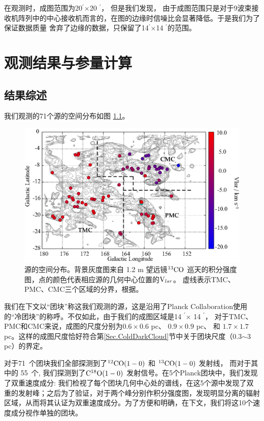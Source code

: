 \documentclass[UTF8, nocolorlinks]{pkuthss}
\newcommand{\cob}{$\rm ^{13}CO$ }
\newcommand{\coaa}{$\rm^{12}CO(1-0)$ }
\newcommand{\cobb}{$\rm^{13}CO(1-0)$ }
\newcommand{\cocc}{$\rm C^{18}O(1-0)$ }
\newcommand{\multi}{$\times$}
\newcommand{\vlsr}{${\rm V } _{lsr}$}
\newcommand{\arcmin}{$^{\prime}$}
\newcommand{\numsou}{71\ }
\newcommand{\numcocc}{55\ }
\begin{document}
        在观测时，成图范围为20\arcmin \multi 20 \arcmin ， 但是我们发现， 由于成图范围只是对于9波束接收机阵列中的中心接收机而言的，在图的边缘时信噪比会显著降低。于是我们为了保证数据质量 舍弃了边缘的数据，只保留了14\arcmin \multi 14 \arcmin 的范围。

\chapter{观测结果与参量计算}

	\section{结果综述}

		我们观测的71个源的空间分布如图 \ref{Fig.SpatialDistribution}。

		\begin{figure}[H]
			\centering
			\includegraphics[totalheight=82mm]{img_plot/SpatiaDist_Velocity_Overlay.eps}
			\caption{\small 源的空间分布。背景灰度图来自 1.2 m 望远镜\cob 巡天的积分强度图\supercite{2001ApJ...547..792D}，点的颜色代表相应源的几何中心位置的\vlsr 。
			虚线表示TMC、PMC、CMC三个区域的分界，根据\parencite{2010A&A...512A..67L}。
			\label{Fig.SpatialDistribution}}
		\end{figure}

		我们在下文以“团块”称这我们观测的源，这是沿用了Planck Collaboration使用的“冷团块”的称呼\supercite{2011A&A...536A..23P}。不仅如此，由于我们的成图区域是14 \arcmin $\times$ 14 \arcmin ， 对于TMC、PMC和CMC来说，成图的尺度分别为$0.6\times0.6$ pc、 $0.9\times0.9$ pc、 和 $1.7\times1.7$ pc。这样的成图尺度恰好符合第\ref{Sec.ColdDarkCloud}节中关于团块尺度（0.3$\sim$3 pc）的界定。

		对于\numsou 个团块我们全部探测到了\coaa  和 \cobb 发射线， 而对于其中的 \numcocc 个, 我们探测到了\cocc 发射信号。在5个Planck团块中，我们发现了双重速度成分: 我们检视了每个团块几何中心处的谱线，在这5个源中发现了双重的发射峰；之后为了验证，对于两个峰分别作积分强度图，发现明显分离的辐射区域，从而将其认证为双重速度成分。为了方便和明确，在下文，我们将这10个速度成分视作单独的团块。
	
\end{document}
